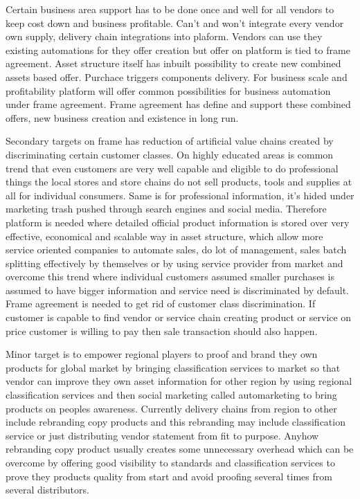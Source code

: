 Certain business area support has to be done once and well for all vendors to keep cost down and business profitable. Can't and won't integrate every vendor own supply, delivery chain integrations into plaform. Vendors can use they existing automations for they offer creation but offer on platform is tied to frame agreement. Asset structure itself has inbuilt possibility to create new combined assets based offer. Purchace triggers components delivery. For business scale and profitability platform will offer common possibilities for business automation under frame agreement. Frame agreement has define and support these combined offers, new business creation and existence in long run.

Secondary targets on frame has reduction of artificial value chains created by discriminating certain customer classes. On highly educated areas is common trend that even customers are very well capable and eligible to do professional things the local stores and store chains do not sell products, tools and supplies at all for individual consumers. Same is for professional information, it's hided under marketing trash pushed through search engines and social media. Therefore platform is needed where detailed official product information is stored over very effective, economical and scalable way in asset structure, which allow more service oriented companies to automate sales, do lot of management, sales batch splitting effectively by themselves or by using service provider from market and overcome this trend where individual customers assumed smaller purchases is assumed to have bigger information and service need is discriminated by default. Frame agreement is needed to get rid of customer class discrimination. If customer is capable to find vendor or service chain creating product or service on price customer is willing to pay then sale transaction should also happen.

Minor target is to empower regional players to proof and brand they own products for global market by bringing classification services to market so that vendor can improve they own asset information for other region by using regional classification services and then social marketing called automarketing to bring products on peoples awareness. Currently delivery chains from region to other include rebranding copy products and this rebranding may include classification service or just distributing vendor statement from fit to purpose. Anyhow rebranding copy product usually creates some unnecessary overhead which can be overcome by offering good visibility to standards and classification services to prove they products quality from start and avoid proofing several times from several distributors.

